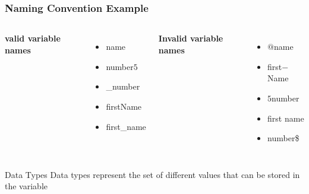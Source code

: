 \documentclass[aspectratio=169,14pt,usenames,dvipsnames]{beamer}
\begin{document}
\begin{frame}
\frametitle{Naming Convention Example}
\begin{columns}
\textbf{valid variable names}
\begin{itemize}
\item name
\item number$5$
\item \_number
\item firstName
\item first\_name
\end{itemize}

\textbf{Invalid variable names}
\begin{itemize}
\item $@$name
\item first$-$Name
\item $5$number

\item first name
\item number\$
\end{itemize}

\end{columns}
\end{frame}












\begin{frame}{Data Types}
Data types represent the set of different values that can be stored in the variable
\end{frame}
\end{document}

